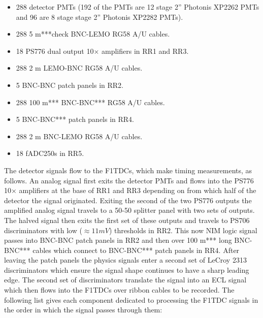 \documentclass[oneside]{book}   %
\begin{document}
\begin{itemize}\itemsep6pt \parskip0pt 
	\item 288 detector PMTs (192 of the PMTs are 12 stage 2'' Photonis XP2262 PMTs and 96 are 8 stage stage 2'' Photonis XP2282 PMTs).
	\item 288 5 m***check BNC-LEMO RG58 A/U cables. 
	\item 18 PS776 dual output 10$\times$ amplifiers in RR1 and RR3.
	\item 288 2 m LEMO-BNC RG58 A/U cables. 
	\item 5 BNC-BNC patch panels in RR2. 
	\item 288 100 m*** BNC-BNC*** RG58 A/U cables. 
	\item 5 BNC-BNC*** patch panels in RR4. 
	\item 288 2 m BNC-LEMO RG58 A/U cables. 
	\item 18 fADC250s in RR5.
\end{itemize}

The detector signals flow to the F1TDCs, which make timing measurements, as follows. An analog signal first exits the detector PMTs and flows into the PS776 10$\times$ amplifiers at the base of RR1 and RR3 depending on from which half of the detector the signal originated. Exiting the second of the two PS776 outputs the amplified analog signal travels to a 50-50 splitter panel with two sets of outputs. The halved signal then exits the first set of these outputs and travels to PS706 discriminators with low ($\approx 11 mV$) thresholds in RR2. This now NIM logic signal passes into BNC-BNC patch panels in RR2 and then over 100 m*** long BNC-BNC*** cables which connect to BNC-BNC*** patch panels in RR4. After leaving the patch panels the physics signals enter a second set of LeCroy 2313 discriminators which ensure the signal shape continues to have a sharp leading edge. The second set of discriminators translate the signal into an ECL signal which then flows into the F1TDCs over ribbon cables to be recorded. The following list gives each component dedicated to processing the F1TDC signals in the order in which the signal passes through them:\\
\end{document}
